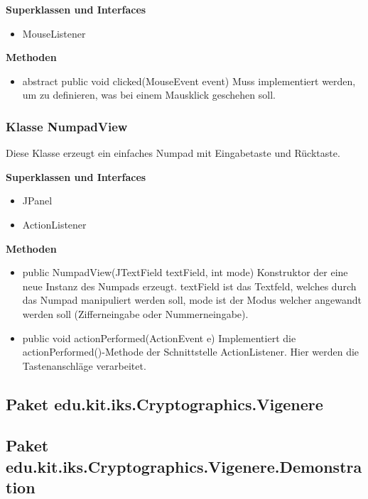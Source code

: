 \documentclass{article}
\begin{document}
    \textbf{Superklassen und Interfaces}
      \begin{itemize}
        \item MouseListener
      \end{itemize}
           
    \textbf{Methoden}
      \begin{itemize}
        \item abstract public void clicked(MouseEvent event)\newline
        	Muss implementiert werden, um zu definieren, was bei einem Mausklick geschehen soll.
      \end{itemize}
      
    \subsubsection{Klasse NumpadView}
    Diese Klasse erzeugt ein einfaches Numpad mit Eingabetaste und Rücktaste.
    
    \textbf{Superklassen und Interfaces}
      \begin{itemize}
        \item JPanel
        \item ActionListener
      \end{itemize}

    \textbf{Methoden}
      \begin{itemize}
        \item public NumpadView(JTextField textField, int mode)\newline
        	Konstruktor der eine neue Instanz des Numpads erzeugt. textField ist das Textfeld,
        	welches durch das Numpad manipuliert werden soll, mode ist der Modus welcher angewandt
        	werden soll (Zifferneingabe oder Nummerneingabe).
        \item public void actionPerformed(ActionEvent e)\newline
        	Implementiert die actionPerformed()-Methode der Schnittstelle ActionListener. Hier
        	werden die Tastenanschläge verarbeitet.
      \end{itemize}

  \subsection{Paket edu.kit.iks.Cryptographics.Vigenere}
	

  \subsection{Paket edu.kit.iks.Cryptographics.Vigenere.Demonstration}
	
\end{document}
